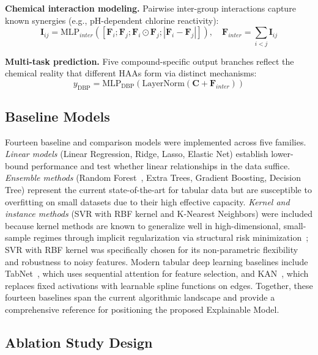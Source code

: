 \documentclass[runningheads]{llncs}
\begin{document}
\textbf{Chemical interaction modeling.} Pairwise inter-group interactions capture known synergies (e.g., pH-dependent chlorine reactivity):
\begin{equation}
\mathbf{I}_{ij} = \text{MLP}_{inter}([\mathbf{F}_i;\mathbf{F}_j;\mathbf{F}_i \odot \mathbf{F}_j;|\mathbf{F}_i - \mathbf{F}_j|]), \quad
\mathbf{F}_{inter} = \sum_{i<j} \mathbf{I}_{ij}
\end{equation}

\textbf{Multi-task prediction.} Five compound-specific output branches reflect the chemical reality that different HAAs form via distinct mechanisms:
\begin{equation}
y_{\text{DBP}} = \text{MLP}_{\text{DBP}}(\text{LayerNorm}(\mathbf{C} + \mathbf{F}_{inter}))
\end{equation}

\subsection{Baseline Models}

Fourteen baseline and comparison models were implemented across five families. \textit{Linear models} (Linear Regression, Ridge, Lasso, Elastic Net) establish lower-bound performance and test whether linear relationships in the data suffice. \textit{Ensemble methods} (Random Forest~\cite{breiman2001random}, Extra Trees, Gradient Boosting, Decision Tree) represent the current state-of-the-art for tabular data but are susceptible to overfitting on small datasets due to their high effective capacity. \textit{Kernel and instance methods} (SVR with RBF kernel and K-Nearest Neighbors) were included because kernel methods are known to generalize well in high-dimensional, small-sample regimes through implicit regularization via structural risk minimization~\cite{vapnik1998statistical}; SVR with RBF kernel was specifically chosen for its non-parametric flexibility and robustness to noisy features. Modern tabular deep learning baselines include TabNet~\cite{arik2021tabnet}, which uses sequential attention for feature selection, and KAN~\cite{liu2024kan}, which replaces fixed activations with learnable spline functions on edges. Together, these fourteen baselines span the current algorithmic landscape and provide a comprehensive reference for positioning the proposed Explainable Model.

\subsection{Ablation Study Design}
\end{document}
